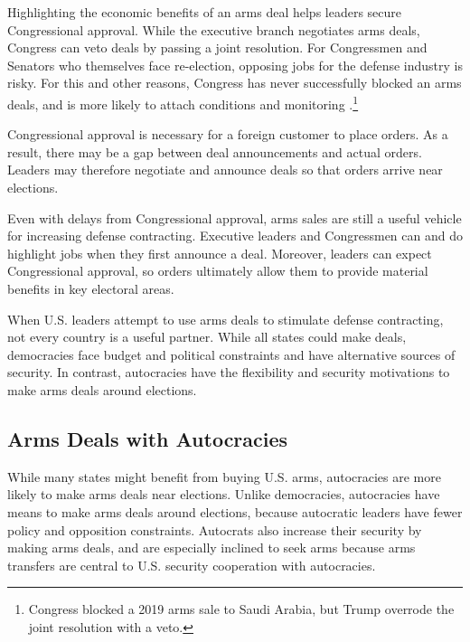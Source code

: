 \documentclass[12pt]{article}
\begin{document}
Highlighting the economic benefits of an arms deal helps leaders secure Congressional approval. 
While the executive branch negotiates arms deals, Congress can veto deals by passing a joint resolution. 
For Congressmen and Senators who themselves face re-election, opposing jobs for the defense industry is risky.
For this and other reasons, Congress has never successfully blocked an arms deals, and is more likely to attach conditions and monitoring \citep{Thralletal2020}.\footnote{Congress blocked a 2019 arms sale to Saudi Arabia, but Trump overrode the joint resolution with a veto.}


Congressional approval is necessary for a foreign customer to place orders. 
As a result, there may be a gap between deal announcements and actual orders.
Leaders may therefore negotiate and announce deals so that orders arrive near elections.  


Even with delays from Congressional approval, arms sales are still a useful vehicle for increasing defense contracting. 
Executive leaders and Congressmen can and do highlight jobs when they first announce a deal. 
Moreover, leaders can expect Congressional approval, so orders ultimately allow them to provide material benefits in key electoral areas. 


When U.S. leaders attempt to use arms deals to stimulate defense contracting, not every country is a useful partner. 
While all states could make deals, democracies face budget and political constraints and have alternative sources of security.
In contrast, autocracies have the flexibility and security motivations to make arms deals around elections.



\subsection{Arms Deals with Autocracies}


While many states might benefit from buying U.S. arms, autocracies are more likely to make arms deals near elections. 
Unlike democracies, autocracies have means to make arms deals around elections, because autocratic leaders have fewer policy and opposition constraints. 
Autocrats also increase their security by making arms deals, and are especially inclined to seek arms because arms transfers are central to U.S. security cooperation with autocracies.
\end{document}
